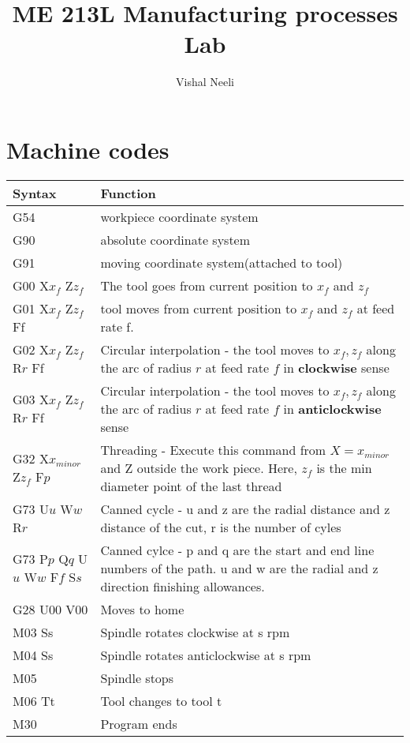 \documentclass{article}
\title{ME 213L Manufacturing processes Lab}
\author{Vishal Neeli}
\begin{document}
\maketitle

\section{Machine codes}
\begin{tabular}{|m{12em}|m{30em}|}
	\hline
	\textbf{Syntax} & \textbf{Function}\\
	\hline
	\hline
	G54 & workpiece coordinate system\\
	\hline
	G90 & absolute coordinate system\\
	\hline
	G91 & moving coordinate system(attached to tool)\\
	\hline
	G00 X$x_f$ Z$z_f$ & The tool goes from current position to $x_f$ and $z_f$\\
	\hline
	G01 X$x_f$ Z$z_f$ Ff & tool moves from current position to $x_f$ and $z_f$ at feed rate f.\\
	\hline
	G02 X$x_f$ Z$z_f$ R$r$ Ff & Circular interpolation - the tool moves to $x_f,z_f$ along the arc of radius $r$ at feed rate $f$ in \textbf{clockwise} sense\\
	\hline
	G03 X$x_f$ Z$z_f$ R$r$ Ff & Circular interpolation - the tool moves to $x_f,z_f$ along the arc of radius $r$ at feed rate $f$ in \textbf{anticlockwise} sense\\
	\hline
	G32 X$x_{minor}$ Z$z_f$ F$p$ & Threading - Execute this command from $X=x_{minor}$ and Z outside the work piece. Here, $z_f$ is the min diameter point of the last thread\\
	\hline
	G73 U$u$ W$w$ R$r$ & Canned cycle - u and z are the radial distance and z distance of the cut, r is the number of cyles\\
	G73 P$p$ Q$q$ U$u$ W$w$ F$f$ S$s$ & Canned cylce - p and q are the start and end line numbers of the path. u and w are the radial and z direction finishing allowances.\\
	\hline
	G28 U00 V00 & Moves to home \\%
	\hline
	M03 Ss & Spindle rotates clockwise at s rpm\\
	\hline
	M04 Ss & Spindle rotates anticlockwise at s rpm\\
	\hline
	M05 & Spindle stops\\
	\hline
	M06 Tt & Tool changes to tool t\\
	\hline
	M30 & Program ends\\
	\hline
	
\end{tabular}
\end{document}
